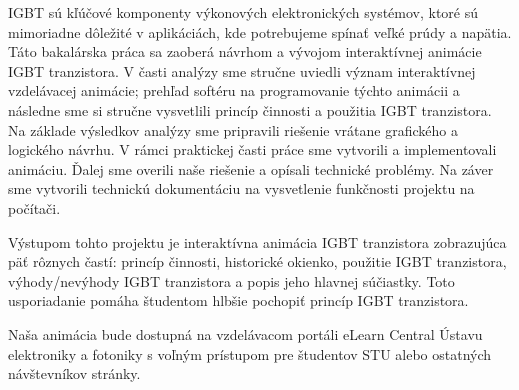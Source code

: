 IGBT sú kľúčové komponenty výkonových elektronických systémov, ktoré sú mimoriadne dôležité v aplikáciách, kde potrebujeme spínať veľké prúdy a napätia. 
Táto bakalárska práca sa zaoberá návrhom a vývojom interaktívnej animácie IGBT tranzistora. V časti analýzy sme stručne uviedli význam interaktívnej vzdelávacej animácie; prehľad softéru na programovanie týchto animácii a následne sme si stručne vysvetlili princíp činnosti a použitia IGBT tranzistora. Na základe výsledkov analýzy sme pripravili riešenie vrátane grafického a logického návrhu. V rámci praktickej časti práce sme vytvorili a implementovali animáciu. Ďalej sme overili naše riešenie a opísali technické problémy. Na záver sme vytvorili technickú dokumentáciu na vysvetlenie funkčnosti projektu na počítači.

Výstupom tohto projektu je interaktívna animácia IGBT tranzistora zobrazujúca päť rôznych častí: princíp činnosti, historické okienko, použitie IGBT tranzistora, výhody/nevýhody IGBT tranzistora a popis jeho hlavnej súčiastky. Toto usporiadanie pomáha študentom hlbšie pochopiť princíp IGBT tranzistora.

Naša animácia bude dostupná na vzdelávacom portáli eLearn Central Ústavu elektroniky a fotoniky s voľným prístupom pre študentov STU alebo ostatných návštevníkov stránky.